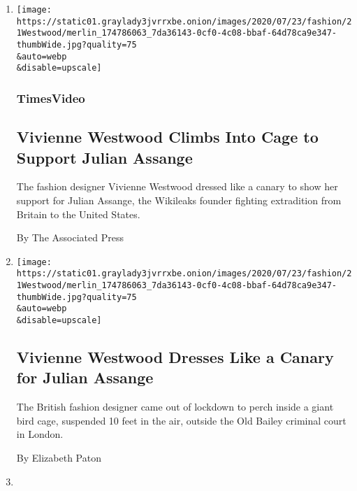 \begin{enumerate}
\def\labelenumi{\arabic{enumi}.}
\item
  \href{/video/us/100000007249534/vivienne-westwood-canary-julian-assange.html}{}

  \texttt{[image: https://static01.graylady3jvrrxbe.onion/images/2020/07/23/fashion/21Westwood/merlin\_174786063\_7da36143-0cf0-4c08-bbaf-64d78ca9e347-thumbWide.jpg?quality=75\\\&auto=webp\\\&disable=upscale]}

  \hypertarget{timesvideo}{%
  \subsubsection{TimesVideo}\label{timesvideo}}

  \hypertarget{vivienne-westwood-climbs-into-cage-to-support-julian-assange}{%
  \subsection{Vivienne Westwood Climbs Into Cage to Support Julian
  Assange}\label{vivienne-westwood-climbs-into-cage-to-support-julian-assange}}

  The fashion designer Vivienne Westwood dressed like a canary to show
  her support for Julian Assange, the Wikileaks founder fighting
  extradition from Britain to the United States.

  By The Associated Press
\item
  \href{/2020/07/21/style/vivienne-westwood-julian-assange.html}{}

  \texttt{[image: https://static01.graylady3jvrrxbe.onion/images/2020/07/23/fashion/21Westwood/merlin\_174786063\_7da36143-0cf0-4c08-bbaf-64d78ca9e347-thumbWide.jpg?quality=75\\\&auto=webp\\\&disable=upscale]}

  \hypertarget{vivienne-westwood-dresses-like-a-canary-for-julian-assange}{%
  \subsection{Vivienne Westwood Dresses Like a Canary for Julian
  Assange}\label{vivienne-westwood-dresses-like-a-canary-for-julian-assange}}

  The British fashion designer came out of lockdown to perch inside a
  giant bird cage, suspended 10 feet in the air, outside the Old Bailey
  criminal court in London.

  By Elizabeth Paton
\item
  \href{/2020/02/25/t-magazine/paris-fashion-week-pictures.html}{}


\end{enumerate}
